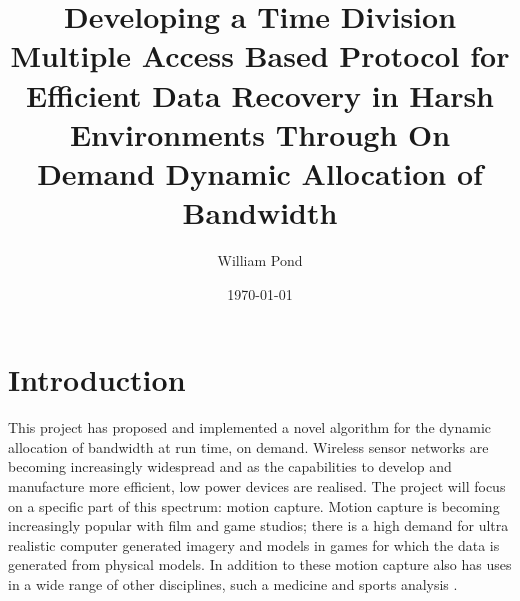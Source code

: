 \documentclass[parskip]{cs4rep}
\begin{document}
\title{Developing a Time Division Multiple Access Based Protocol for Efficient Data Recovery in Harsh Environments Through On Demand Dynamic Allocation of Bandwidth}

\author{William Pond}




\date{\today}



\maketitle

\tableofcontents


\chapter{Introduction}

This project has proposed and implemented a novel algorithm for the dynamic allocation of bandwidth at run time, on demand. Wireless sensor networks are becoming increasingly widespread and as the capabilities to develop and manufacture more efficient, low power devices are realised. The project will focus on a specific part of this spectrum: motion capture. Motion capture is becoming increasingly popular with film and game studios; there is a high demand for ultra realistic computer generated imagery and models in games for which the data is generated from physical models. In addition to these motion capture also has uses in a wide range of other disciplines, such a medicine \cite{SPECK1} and sports analysis \cite{SPECK2}.
\end{document}
